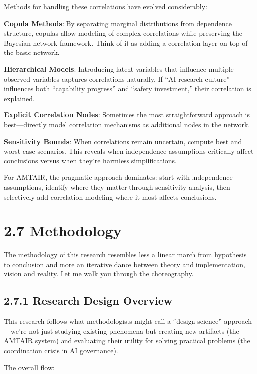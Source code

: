 \documentclass[
  11pt,
  letterpaper,
]{book}
\begin{document}
Methods for handling these correlations have evolved considerably:

\textbf{Copula Methods}: By separating marginal distributions from
dependence structure, copulas \textcite{nelson2006} allow modeling of
complex correlations while preserving the Bayesian network framework.
Think of it as adding a correlation layer on top of the basic network.

\textbf{Hierarchical Models}: Introducing latent variables that
influence multiple observed variables captures correlations naturally.
If ``AI research culture'' influences both ``capability progress'' and
``safety investment,'' their correlation is explained.

\textbf{Explicit Correlation Nodes}: Sometimes the most straightforward
approach is best---directly model correlation mechanisms as additional
nodes in the network.

\textbf{Sensitivity Bounds}: When correlations remain uncertain, compute
best and worst case scenarios. This reveals when independence
assumptions critically affect conclusions versus when they're harmless
simplifications.

For AMTAIR, the pragmatic approach dominates: start with independence
assumptions, identify where they matter through sensitivity analysis,
then selectively add correlation modeling where it most affects
conclusions.

\section{2.7 Methodology}\label{sec-methodology}

The methodology of this research resembles less a linear march from
hypothesis to conclusion and more an iterative dance between theory and
implementation, vision and reality. Let me walk you through the
choreography.

\subsection{2.7.1 Research Design Overview}\label{sec-research-design}

This research follows what methodologists might call a ``design
science'' approach---we're not just studying existing phenomena but
creating new artifacts (the AMTAIR system) and evaluating their utility
for solving practical problems (the coordination crisis in AI
governance).

The overall flow:
\end{document}
